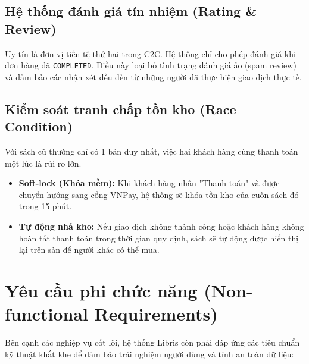 \documentclass[../main.tex]{subfiles}
\begin{document}
\subsection{Hệ thống đánh giá tín nhiệm (Rating \& Review)}
Uy tín là đơn vị tiền tệ thứ hai trong C2C. Hệ thống chỉ cho phép đánh giá khi đơn hàng đã \texttt{COMPLETED}. Điều này loại bỏ tình trạng đánh giá ảo (spam review) và đảm bảo các nhận xét đều đến từ những người đã thực hiện giao dịch thực tế.

\subsection{Kiểm soát tranh chấp tồn kho (Race Condition)}
Với sách cũ thường chỉ có 1 bản duy nhất, việc hai khách hàng cùng thanh toán một lúc là rủi ro lớn.
\begin{itemize}
    \item \textbf{Soft-lock (Khóa mềm):} Khi khách hàng nhấn "Thanh toán" và được chuyển hướng sang cổng VNPay, hệ thống sẽ khóa tồn kho của cuốn sách đó trong 15 phút.
    \item \textbf{Tự động nhả kho:} Nếu giao dịch không thành công hoặc khách hàng không hoàn tất thanh toán trong thời gian quy định, sách sẽ tự động được hiển thị lại trên sàn để người khác có thể mua.
\end{itemize}

\section{Yêu cầu phi chức năng (Non-functional Requirements)}
Bên cạnh các nghiệp vụ cốt lõi, hệ thống Libris còn phải đáp ứng các tiêu chuẩn kỹ thuật khắt khe để đảm bảo trải nghiệm người dùng và tính an toàn dữ liệu:
\end{document}
